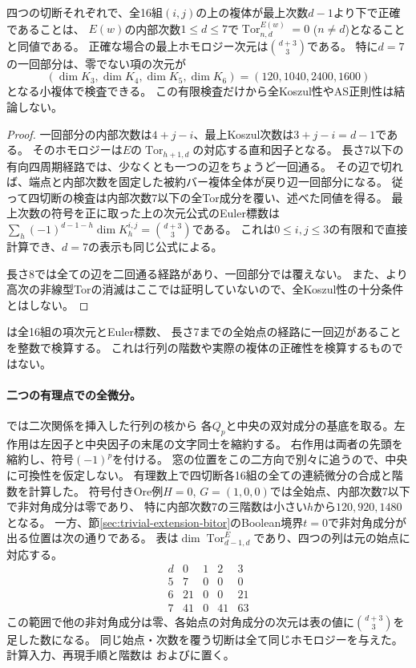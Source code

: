 \begin{proposition}[七次切断の必要十分な共通検査]
\label{prop:cut-tor-through-seven}
四つの切断それぞれで、全16組$(i,j)$の上の複体が最上次数$d-1$より下で正確であることは、
$E(w)$の内部次数$1\leq d\leq7$で$\operatorname{Tor}_{n,d}^{E(w)}=0$ ($n\ne d$)となることと同値である。
正確な場合の最上ホモロジー次元は$\binom{d+3}{3}$である。
特に$d=7$の一回部分は、零でない項の次元が
\[
 (\dim K_3,\dim K_4,\dim K_5,\dim K_6)=(120,1040,2400,1600)
\]
となる小複体で検査できる。
この有限検査だけから全Koszul性やAS正則性は結論しない。
\end{proposition}
\begin{proof}
一回部分の内部次数は$4+j-i$、最上Koszul次数は$3+j-i=d-1$である。
そのホモロジーは$E$の$\operatorname{Tor}_{h+1,d}$の対応する直和因子となる。
長さ7以下の有向四周期経路では、少なくとも一つの辺をちょうど一回通る。
その辺で切れば、端点と内部次数を固定した被約バー複体全体が戻り辺一回部分になる。
従って四切断の検査は内部次数7以下の全Tor成分を覆い、述べた同値を得る。
最上次数の符号を正に取った上の次元公式のEuler標数は
$\sum_h(-1)^{d-1-h}\dim K_h^{i,j}=\binom{d+3}{3}$である。
これは$0\leq i,j\leq3$の有限和で直接計算でき、$d=7$の表示も同じ公式による。

長さ8では全ての辺を二回通る経路があり、一回部分では覆えない。
また、より高次の非線型Torの消滅はここでは証明していないので、全Koszul性の十分条件とはしない。
\end{proof}

は全16組の項次元とEuler標数、
長さ7までの全始点の経路に一回辺があることを整数で検算する。
これは行列の階数や実際の複体の正確性を検算するものではない。

\paragraph{二つの有理点での全微分。}
では二次関係を挿入した行列の核から
各$Q_p$と中央の双対成分の基底を取る。左作用は左因子と中央因子の末尾の文字同士を縮約する。
右作用は両者の先頭を縮約し、符号$(-1)^p$を付ける。
窓の位置をこの二方向で別々に追うので、中央に可換性を仮定しない。
有理数上で四切断各16組の全ての連続微分の合成と階数を計算した。
符号付きOre例$H=0$, $G=(1,0,0)$では全始点、内部次数7以下で非対角成分は零であり、
特に内部次数7の三階数は小さい$h$から$120,920,1480$となる。
一方、節\ref{sec:trivial-extension-bitor}のBoolean境界$t=0$で非対角成分が出る位置は次の通りである。
表は$\dim\operatorname{Tor}^{E}_{d-1,d}$であり、四つの列は元の始点に対応する。
\[
\begin{array}{c|rrrr}
d&0&1&2&3\\ \hline
5&7&0&0&0\\
6&21&0&0&21\\
7&41&0&41&63
\end{array}
\]
この範囲で他の非対角成分は零、各始点の対角成分の次元は表の値に$\binom{d+3}{3}$を足した数になる。
同じ始点・次数を覆う切断は全て同じホモロジーを与えた。計算入力、再現手順と階数は
およびに置く。
